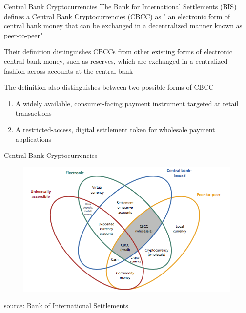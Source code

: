 \documentclass[10pt]{beamer}
\begin{document}
\begin{frame}{Central Bank Cryptocurrencies}
	The Bank for International Settlements (BIS) defines a Central Bank Cryptocurrencies (CBCC) as " an electronic form of central bank money that can be
	exchanged in a decentralized manner known as peer-to-peer" \\ \vspace{3mm}

	Their definition distinguishes CBCCs from other existing forms of electronic central bank money, such as reserves, which are exchanged in a centralized fashion across accounts at the central bank\\ \vspace{3mm}

	The definition also distinguishes between two possible forms of CBCC
	\begin{enumerate}
		\item A widely available, consumer-facing payment instrument targeted at retail transactions
		\item A restricted-access, digital settlement token for wholesale payment applications
	\end{enumerate}
\end{frame}



\begin{frame}{Central Bank Cryptocurrencies}
	\begin{figure}[]
		\centering
		\includegraphics  [width=4.in]{Images/taxonomy}
	\end{figure}
	\begin{scriptsize}
		source: \href{https://www.bis.org/publ/qtrpdf/r_qt1709f.pdf}{Bank of International Settlements}
	\end{scriptsize}
\end{frame}

\end{document}
